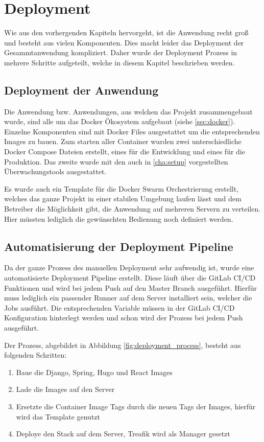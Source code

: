 
\section{Deployment}
\label{sec:deployment}

Wie aus den vorhergenden Kapiteln hervorgeht, ist die Anwendung recht groß und besteht aus vielen Komponenten.
Dies macht leider das Deployment der Gesammtanwendung kompliziert.
Daher wurde der Deployment Prozess in mehrere Schritte aufgeteilt, welche in diesem Kapitel beschrieben werden.


\subsection{Deployment der Anwendung}
Die Anwendung bzw. Anwendungen, aus welchen das Projekt zusammengebaut wurde, sind alle um das Docker Ökosystem aufgebaut (siehe \ref{sec:docker}).
Einzelne Komponenten sind mit Docker Files ausgestattet um die entsprechenden Images zu bauen.
Zum starten aller Container wurden zwei unterschiedliche Docker Compose Dateien erstellt, eines für die Entwicklung und eines für die Produktion. Das zweite wurde mit den auch in \ref{cha:setup} vorgestellten Überwachungstools ausgestattet.

Es wurde auch ein Template für die Docker Swarm Orchestrierung erstellt, welches das ganze Projekt in einer stabilen Umgebung laufen lässt und dem Betreiber die Möglichkeit gibt, die Anwendung auf mehreren Servern zu verteilen. 
Hier müssten lediglich die gewünschten Bedienung noch definiert werden.


\subsection{Automatisierung der Deployment Pipeline}
\label{sec:deployment_pipeline}

Da der ganze Prozess des manuellen Deployment sehr aufwendig ist, wurde eine automatisierte Deployment Pipeline erstellt.
Diese läuft über die GitLab CI/CD Funktionen und wird bei jedem Push auf den Master Branch ausgeführt.
Hierfür muss lediglich ein passender Runner auf dem Server installiert sein, welcher die Jobs ausführt. Die entsprechenden Variable müssen in der GitLab CI/CD Konfiguration hinterlegt werden und schon wird der Prozess bei jedem Push ausgeführt.

Der Prozess, abgebildet in Abbildung \ref{fig:deployment_process}, besteht aus folgenden Schritten:
\begin{enumerate}
    \item Baue die Django, Spring, Hugo und React Images
    \item Lade die Images auf den Server
    \item Ersetzte die Container Image Tags durch die neuen Tags der Images, hierfür wird das Template genutzt
    \item Deploye den Stack auf dem Server, Treafik wird als Manager gesetzt
\end{enumerate}


